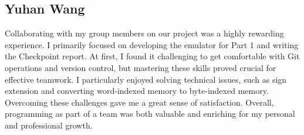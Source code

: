 \documentclass[11pt]{article}
\begin{document}
\subsection{Yuhan Wang}
Collaborating with my group members on our project was a highly rewarding
experience. I primarily focused on developing the emulator for Part 1 and
writing the Checkpoint report. At first, I found it challenging to get
comfortable with Git operations and version control, but mastering these skills
proved crucial for effective teamwork. I particularly enjoyed solving technical
issues, such as sign extension and converting word-indexed memory to
byte-indexed memory. Overcoming these challenges gave me a great sense of
satisfaction. Overall, programming as part of a team was both valuable and
enriching for my personal and professional growth.
\end{document}
